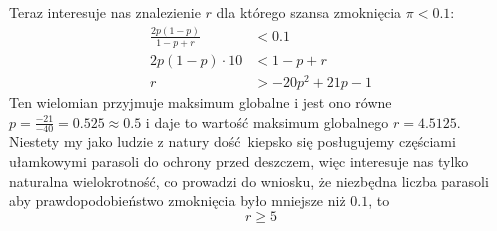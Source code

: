 \documentclass[12pt,a4paper]{article}
\begin{document}
Teraz interesuje nas znalezienie $r$ dla którego szansa zmoknięcia $\pi<0.1$:
\begin{align*}
    \frac{2p(1-p)}{1-p+r} &< 0.1\\
    2p(1-p) \cdot 10 &< 1 - p + r\\
    r &> -20p^2 + 21p - 1
\end{align*}
Ten wielomian przyjmuje maksimum globalne i jest ono równe $p = \frac{-21}{-40} = 0.525 \approx 0.5$ i daje to wartość maksimum globalnego $r = 4.5125$. Niestety my jako ludzie z natury dość kiepsko się posługujemy częściami ułamkowymi parasoli do ochrony przed deszczem, więc interesuje nas tylko naturalna wielokrotność, co prowadzi do wniosku, że niezbędna liczba parasoli aby prawdopodobieństwo zmoknięcia było mniejsze niż $0.1$, to \[ r \geq 5 \]
\end{document}
